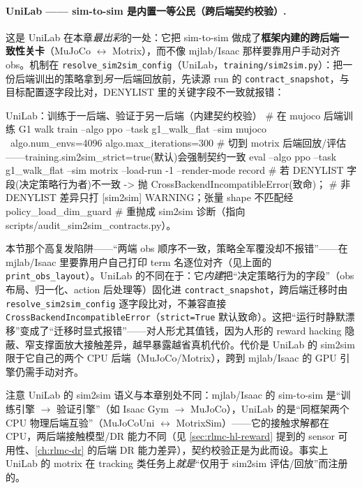 \paragraph{UniLab —— sim-to-sim 是内置一等公民（跨后端契约校验）.}
这是 UniLab 在本章\emph{最出彩}的一处：它把 sim-to-sim 做成了\textbf{框架内建的跨后端一致性关卡}（MuJoCo $\leftrightarrow$ Motrix），而不像 mjlab/Isaac 那样要靠用户手动对齐 obs。机制在 \texttt{resolve\_sim2sim\_config}（UniLab，\texttt{training/sim2sim.py}）：把一份后端训出的策略拿到\emph{另一}后端回放前，先读源 run 的 \texttt{contract\_snapshot}，与目标配置逐字段比对，DENYLIST 里的关键字段不一致就报错：

\begin{codebox}[bash]{UniLab：训练于一后端、验证于另一后端（内建契约校验）}
# 在 mujoco 后端训练 G1 walk
train --algo ppo --task g1_walk_flat --sim mujoco \
    algo.num_envs=4096 algo.max_iterations=300
# 切到 motrix 后端回放/评估——training.sim2sim_strict=true(默认)会强制契约一致
eval --algo ppo --task g1_walk_flat --sim motrix --load-run -1 --render-mode record
#   若 DENYLIST 字段(决定策略行为者)不一致 -> 抛 CrossBackendIncompatibleError(致命)；
#   非 DENYLIST 差异只打 [sim2sim] WARNING；张量 shape 不匹配经 policy_load_dim_guard
#   重抛成 sim2sim 诊断（指向 scripts/audit_sim2sim_contracts.py）。
\end{codebox}

\begin{insight}\label{ins:rlmc-hl-sim2sim}
本节那个高复发陷阱——“两端 obs 顺序不一致，策略全军覆没却不报错”——在 mjlab/Isaac 里要靠用户自己打印 term 名逐位对齐（见上面的 \texttt{print\_obs\_layout}）。UniLab 的不同在于：它\emph{内建}把“决定策略行为的字段”（obs 布局、归一化、action 后处理等）固化进 \texttt{contract\_snapshot}，跨后端迁移时由 \texttt{resolve\_sim2sim\_config} 逐字段比对，不兼容直接 \texttt{CrossBackendIncompatibleError}（\texttt{strict=True} 默认致命）。这把“运行时静默漂移”变成了“迁移时显式报错”——对人形尤其值钱，因为人形的 reward hacking 隐蔽、窄支撑面放大接触差异，越早暴露越省真机代价。代价是 UniLab 的 sim2sim 限于它自己的两个 CPU 后端（MuJoCo/Motrix），跨到 mjlab/Isaac 的 GPU 引擎仍需手动对齐。
\end{insight}

注意 UniLab 的 sim2sim 语义与本章别处不同：mjlab/Isaac 的 sim-to-sim 是“训练引擎 $\to$ 验证引擎”（如 Isaac Gym $\to$ MuJoCo），UniLab 的是“同框架两个 CPU 物理后端互验”（MuJoCoUni $\leftrightarrow$ MotrixSim）——它的接触求解都在 CPU，两后端接触模型/DR 能力不同（见 \cref{sec:rlmc-hl-reward} 提到的 sensor 可用性、\cref{ch:rlmc-dr} 的后端 DR 能力差异），契约校验正是为此而设。事实上 UniLab 的 motrix 在 tracking 类任务上\emph{就是}“仅用于 sim2sim 评估/回放”而注册的。

